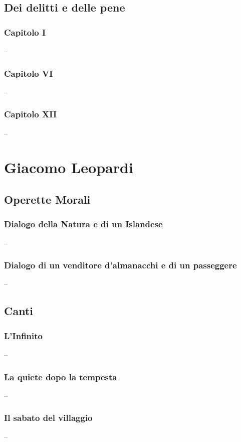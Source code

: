 \documentclass{article}
\begin{document}
\subsection{Dei delitti e delle pene}
\subsubsection{Capitolo I}

--

\newpage
\subsubsection{Capitolo VI}

--

\newpage
\subsubsection{Capitolo XII}

--

\newpage
\section{Giacomo Leopardi}
\subsection{Operette Morali}
\subsubsection{Dialogo della Natura e di un Islandese}

--

\newpage
\subsubsection{Dialogo di un venditore d'almanacchi e di un passeggere}

--

\newpage
\subsection{Canti}
\subsubsection{L'Infinito}

--

\newpage
\subsubsection{La quiete dopo la tempesta}

--

\newpage
\subsubsection{Il sabato del villaggio}

--
\end{document}
